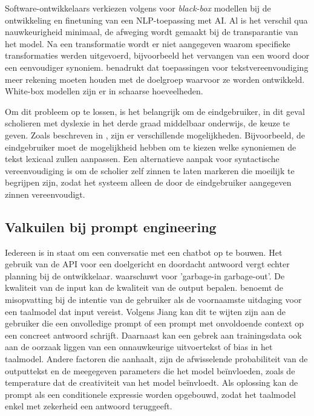 Software-ontwikkelaars verkiezen volgens \textcite{Punardeep2020} voor \textit{black-box} modellen bij de ontwikkeling en finetuning van een NLP-toepassing met AI. Al is het verschil qua nauwkeurigheid minimaal, de afweging wordt gemaakt bij de transparantie van het model. Na een transformatie wordt er niet aangegeven waarom specifieke transformaties werden uitgevoerd, bijvoorbeeld het vervangen van een woord door een eenvoudiger synoniem. \textcite{Xu2015} benadrukt dat toepassingen voor tekstvereenvoudiging meer rekening moeten houden met de doelgroep waarvoor ze worden ontwikkeld. White-box modellen zijn er in schaarse hoeveelheden. 

Om dit probleem op te lossen, is het belangrijk om de eindgebruiker, in dit geval scholieren met dyslexie in het derde graad middelbaar onderwijs, de keuze te geven. Zoals beschreven in \textcite{Gooding2022}, zijn er verschillende mogelijkheden. Bijvoorbeeld, de eindgebruiker moet de mogelijkheid hebben om te kiezen welke synoniemen de tekst lexicaal zullen aanpassen. Een alternatieve aanpak voor syntactische vereenvoudiging is om de scholier zelf zinnen te laten markeren die moeilijk te begrijpen zijn, zodat het systeem alleen de door de eindgebruiker aangegeven zinnen vereenvoudigt.

\subsection{Valkuilen bij prompt engineering}

Iedereen is in staat om een conversatie met een chatbot op te bouwen. Het gebruik van de API voor een doelgericht en doordacht antwoord vergt echter planning bij de ontwikkelaar. \textcite{Miszczak2023} waarschuwt voor 'garbage-in garbage-out'. De kwaliteit van de input kan de kwaliteit van de output bepalen. \textcite{Jiang2023} benoemt de misopvatting bij de intentie van de gebruiker als de voornaamste uitdaging voor een taalmodel dat input vereist. Volgens Jiang kan dit te wijten zijn aan de gebruiker die een onvolledige prompt of een prompt met onvoldoende context op een concreet antwoord schrijft. Daarnaast kan een gebrek aan trainingsdata ook aan de oorzaak liggen van een onnauwkeurige uitvoertekst of bias in het taalmodel. Andere factoren die \textcite{Miszczak2023} aanhaalt, zijn de afwisselende probabiliteit van de outputtekst en de meegegeven parameters die het model beïnvloeden, zoals de temperature dat de creativiteit van het model beïnvloedt. Als oplossing kan de prompt als een conditionele expressie worden opgebouwd, zodat het taalmodel enkel met zekerheid een antwoord teruggeeft.

